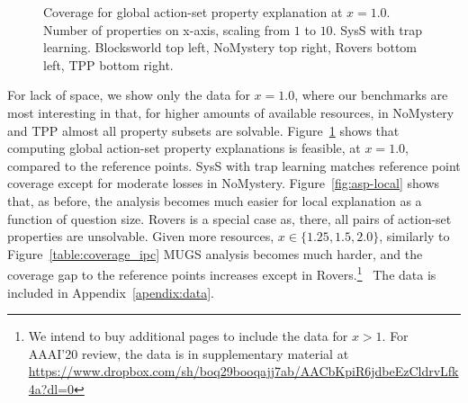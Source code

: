 %
\begin{figure}[h!]
\vspace{-0.3cm}
\small
\centering


\vspace{-0.25cm}
\caption{\label{fig:asp-global} Coverage for global action-set 
property explanation at $x=1.0$.  Number of properties on x-axis,
scaling from $1$ to $10$. SysS with trap learning. Blocksworld top
left, NoMystery top right, Rovers bottom left, TPP bottom
right.
}
%
%
%
\vspace{-0.3cm}
\end{figure}

For lack of space, we show only the data for $x = 1.0$, where our
benchmarks are most interesting in that, for higher amounts of
available resources, in NoMystery and TPP almost all property subsets
are solvable.
%
Figure~\ref{fig:asp-global} shows that computing global action-set
property explanations is feasible, at $x=1.0$, compared to the
reference points. SysS with trap learning matches reference point
coverage except for moderate losses in NoMystery.
%
Figure~\ref{fig:asp-local} shows that, as before, the analysis becomes
much easier for local explanation as a function of question size.
%
Rovers is a special case as, there, all pairs of action-set properties
are unsolvable.
%
Given more resources, $x \in \{1.25, 1.5, 2.0\}$, 
%
%
%
similarly to Figure~\ref{table:coverage_ipc} MUGS analysis becomes
much harder, and the coverage gap to the reference points increases
except in Rovers.\ifdefined\suppflagdefined\else\footnote{We intend to
buy additional pages to include the data for $x > 1$. For AAAI'20
review, the data is in supplementary material at
{\scriptsize \url{https://www.dropbox.com/sh/boq29booqajj7ab/AACbKpiR6jdbeEzCldrvLfk4a?dl=0}}}\fi\
%
\ifdefined\suppflagdefined
%
The data is included in Appendix~\ref{apendix:data}.
%
\fi


